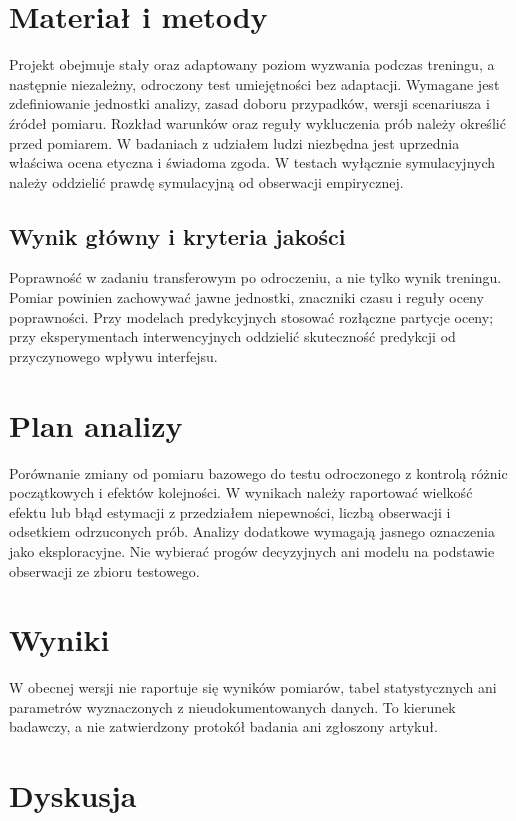 \documentclass[11pt,a4paper]{article}
\begin{document}
\section{Materiał i metody}

Projekt obejmuje stały oraz adaptowany poziom wyzwania podczas treningu, a następnie niezależny, odroczony test umiejętności bez adaptacji. Wymagane jest zdefiniowanie jednostki analizy, zasad doboru przypadków, wersji scenariusza i źródeł pomiaru. Rozkład warunków oraz reguły wykluczenia prób należy określić przed pomiarem. W badaniach z udziałem ludzi niezbędna jest uprzednia właściwa ocena etyczna i świadoma zgoda. W testach wyłącznie symulacyjnych należy oddzielić prawdę symulacyjną od obserwacji empirycznej.

\subsection{Wynik główny i kryteria jakości}

Poprawność w zadaniu transferowym po odroczeniu, a nie tylko wynik treningu. Pomiar powinien zachowywać jawne jednostki, znaczniki czasu i reguły oceny poprawności. Przy modelach predykcyjnych stosować rozłączne partycje oceny; przy eksperymentach interwencyjnych oddzielić skuteczność predykcji od przyczynowego wpływu interfejsu.

\section{Plan analizy}

Porównanie zmiany od pomiaru bazowego do testu odroczonego z kontrolą różnic początkowych i efektów kolejności. W wynikach należy raportować wielkość efektu lub błąd estymacji z przedziałem niepewności, liczbą obserwacji i odsetkiem odrzuconych prób. Analizy dodatkowe wymagają jasnego oznaczenia jako eksploracyjne. Nie wybierać progów decyzyjnych ani modelu na podstawie obserwacji ze zbioru testowego.

\section{Wyniki}

W obecnej wersji nie raportuje się wyników pomiarów, tabel statystycznych ani parametrów wyznaczonych z nieudokumentowanych danych. To kierunek badawczy, a nie zatwierdzony protokół badania ani zgłoszony artykuł.

\section{Dyskusja}
\end{document}
